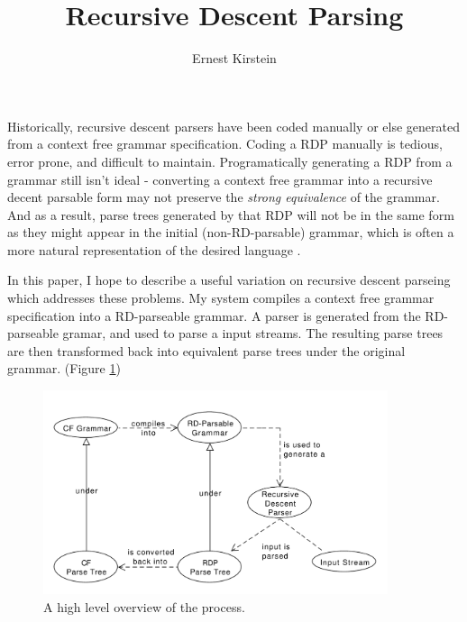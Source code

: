 \documentclass[11pt]{article}
\begin{document}
\title{Recursive Descent Parsing}
\author{Ernest Kirstein}
\maketitle

Historically, recursive descent parsers have been coded manually or else generated from 
a context free grammar specification. \cite{lewis, formal_langs} 
Coding a RDP manually is tedious, error prone, and difficult to maintain.
Programatically generating a RDP from a grammar
still isn't ideal - converting a context free grammar into
a recursive decent parsable form may not preserve the {\em strong equivalence} of the grammar.
And as a result, parse trees generated by that RDP will not be in the same form
as they might appear in the initial (non-RD-parsable) grammar, which is often a more 
natural representation of the desired language \cite{compiler}.

In this paper, I hope to describe a useful variation on recursive descent parseing
which addresses these problems. My system compiles a context free grammar 
specification into a RD-parseable grammar.
A parser is generated from the RD-parseable gramar,
and used to parse a input streams. 
The resulting parse trees are then transformed back into equivalent
parse trees under the original grammar. (Figure \ref{fig:high_level})

\begin{figure}[h!]
    \centering
    \includegraphics[width=0.9\textwidth,natwidth=1,natheight=1]{high_level.pdf}
    \caption{A high level overview of the process.}
    \label{fig:high_level}
\end{figure}

\clearpage
\end{document}
